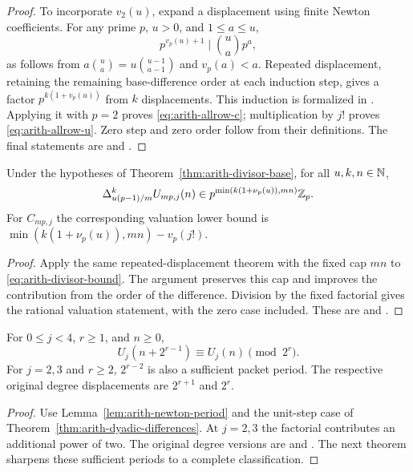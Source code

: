 \begin{proof}
To incorporate $v_2(u)$, expand a displacement using finite Newton
coefficients.  For any prime $p$, $u>0$, and $1\le a\le u$,
\[
 p^{v_p(u)+1}\mid\binom ua p^a,
\]
as follows from $a\binom ua=u\binom{u-1}{a-1}$ and $v_p(a)<a$.
Repeated displacement, retaining the remaining base-difference order
at each induction step, gives a factor $p^{k(1+v_p(u))}$ from $k$
displacements.  This induction is formalized in
.
Applying it with $p=2$ proves \eqref{eq:arith-allrow-c}; multiplication
by $j!$ proves \eqref{eq:arith-allrow-u}.  Zero step and zero order follow
from their definitions.  The final statements are
and
.
\end{proof}

\begin{corollary}\label{cor:arith-amplified}
Under the hypotheses of Theorem~\ref{thm:arith-divisor-base}, for all
$u,k,n\in\mathbb N$,
\[
 \Delta_{u(p-1)/m}^{k}U_{mp,j}(n)
       \in p^{\min(k(1+\nu_p(u)),mn)}\mathbb Z_p.
\]
For $C_{mp,j}$ the corresponding valuation lower bound is
$\min(k(1+\nu_p(u)),mn)-v_p(j!)$.
\end{corollary}

\begin{proof}
Apply the same repeated-displacement theorem with the fixed cap $mn$ to
\eqref{eq:arith-divisor-bound}.  The argument preserves this cap and
improves the contribution from the order of the difference.
Division by the fixed factorial gives the rational valuation statement,
with the zero case included.
These are
and
.
\end{proof}

\begin{corollary}\label{cor:arith-allrow-period}
For $0\le j<4$, $r\ge1$, and $n\ge0$,
\[
 U_j(n+2^{r-1})\equiv U_j(n)\pmod{2^r}.
\]
For $j=2,3$ and $r\ge2$, $2^{r-2}$ is also a sufficient packet period.
The respective original degree displacements are $2^{r+1}$ and $2^r$.
\end{corollary}

\begin{proof}
Use Lemma~\ref{lem:arith-newton-period} and the unit-step case of
Theorem~\ref{thm:arith-dyadic-differences}.  At $j=2,3$ the factorial
contributes an additional power of two.  The original degree versions are
and
.
The next theorem sharpens these sufficient periods to a complete
classification.
\end{proof}

